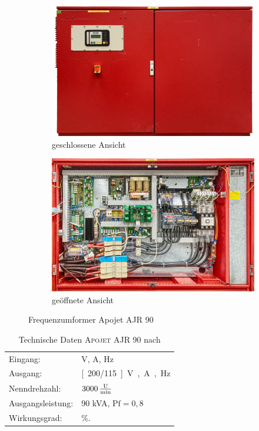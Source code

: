 \begin{figure}
\centering
\begin{subfigure}{.49\textwidth}
	\centering
	\includegraphics[width=\textwidth]{Bilder/Umformer_vorne_geschlossen.pdf}
	\caption{geschlossene Ansicht}
\end{subfigure}
\begin{subfigure}{.49\textwidth}
	\centering
	\includegraphics[width=\textwidth]{Bilder/Umformer_vorne_offen.pdf}
	\caption{geöffnete Ansicht}
\end{subfigure}
\caption{Frequenzumformer Apojet AJR 90}
\label{fig:RenderbildUmformer}
\end{figure}

\begin{table}[b]
\caption{Technische Daten \textsc{Apojet AJR 90} nach \cite{pillerpowersystemsBetriebshandbuchAPOJET202021}}\label{tab:Leistungsdaten}
\centering
\begin{tabular}{@{}ll@{}}
\toprule
Eingang:         & \unit[400]{V}, \unit[145]{A}, \unit[50]{Hz}      \\ 
Ausgang:         & \unit[200/115]{V}, \unit[260]{A}, \unit[400]{Hz} \\
Nenndrehzahl:    & $\unit[3000]{\frac{U}{min}}$                     \\
Ausgangsleistung:& 90 kVA, $\mathrm{Pf}=0,8$                        \\
Wirkungsgrad:    & \unit[85]{\%}.                                   \\ \bottomrule
\end{tabular}
\end{table}

